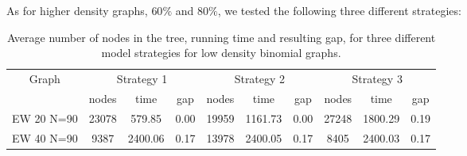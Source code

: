 As for higher density graphs, $60\%$ and $80\%$, we tested the following three different strategies:

\begin{itemize}
\end{itemize}

\begin{table}[h]
\label{table:bnc:modellow}
\centering
\begin{tabular}{|c|ccc|ccc|ccc|}
\hline
\multicolumn{1}{|c|}{Graph} & \multicolumn{3}{|c|}{Strategy 1} & \multicolumn{3}{|c|}{Strategy 2} & \multicolumn{3}{|c|}{Strategy 3}
\\
 & nodes & time & gap & nodes & time & gap & nodes & time & gap
\\
\hline
EW 20 N=90 & 23078 & 579.85 & 0.00 & 19959 & 1161.73 & 0.00 & 27248 & 1800.29 & 0.19
\\
EW 40 N=90 & 9387 & 2400.06 & 0.17 & 13978 & 2400.05 & 0.17 & 8405 & 2400.03 & 0.17
\\
\hline 
 \end{tabular}

\caption{Average number of nodes in the tree, running time and resulting gap, for three different model strategies for low density binomial graphs.}

\end{table}

